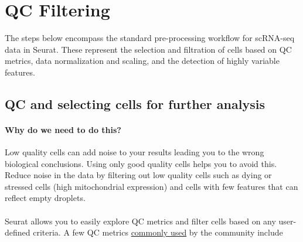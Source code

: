 \documentclass[
]{book}
\begin{document}
\chapter{QC Filtering}\label{qc}

The steps below encompass the standard pre-processing workflow for scRNA-seq data in Seurat. These represent the selection and filtration of cells based on QC metrics, data normalization and scaling, and the detection of highly variable features.

\section{QC and selecting cells for further analysis}\label{qc-and-selecting-cells-for-further-analysis}

\subsubsection*{Why do we need to do this?}\label{why-do-we-need-to-do-this}

Low quality cells can add noise to your results leading you to the wrong biological conclusions. Using only good quality cells helps you to avoid this. Reduce noise in the data by filtering out low quality cells such as dying or stressed cells (high mitochondrial expression) and cells with few features that can reflect empty droplets.

\subsubsection*{}\label{section-1}

Seurat allows you to easily explore QC metrics and filter cells based on any user-defined criteria. A few QC metrics \href{https://www.ncbi.nlm.nih.gov/pmc/articles/PMC4758103/}{commonly used} by the community include
\end{document}
